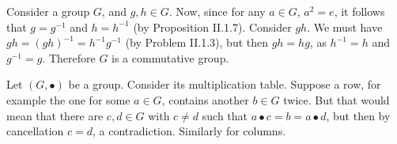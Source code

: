 \begin{problem}
\end{problem}

\begin{solution}
	Consider a group $G$, and $g, h \in G$. Now, since for any $a \in G$, $a^2 = e$, it follows that $g = g^{-1}$ and $h = h^{-1}$ (by Proposition II.1.7). Consider $gh$. We must have $gh = (gh)^{-1} = h^{-1}g^{-1}$ (by Problem II.1.3), but then $gh = hg$, as $h^{-1} = h$ and $g^{-1} = g$. Therefore $G$ is a commutative group.
\end{solution}

\begin{problem}
\end{problem}

\begin{solution}
	Let $(G, \bullet)$ be a group. Consider its multiplication table. Suppose a row, for example the one for some $a \in G$, contains another $b \in G$ twice. But that would mean that there are $c, d \in G$ with $c \neq d$ such that $a \bullet c = b = a \bullet d$, but then by cancellation $c = d$, a contradiction. Similarly for columns.
\end{solution}

\begin{problem}
\end{problem}

